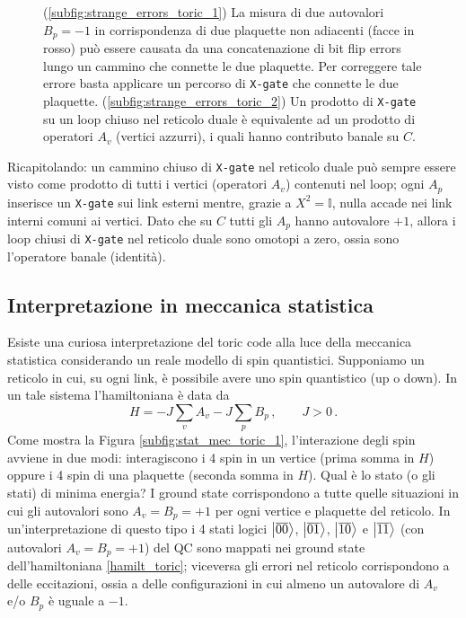 \begin{figure}[!ht]
	\caption{(\ref{subfig:strange_errors_toric_1}) La misura di due autovalori $B_p = -1$ in corrispondenza di due plaquette non adiacenti (facce in rosso) può essere causata da una concatenazione di bit flip errors lungo un cammino che connette le due plaquette. Per correggere tale errore basta applicare un percorso di \texttt{X-gate} che connette le due plaquette. (\ref{subfig:strange_errors_toric_2}) Un prodotto di \texttt{X-gate} su un loop chiuso nel reticolo duale è equivalente ad un prodotto di operatori $A_v$ (vertici azzurri), i quali hanno contributo banale su $C$.}
    \label{fig:strange_errors_toric}
\end{figure}

\noindent Ricapitolando: un cammino chiuso di \texttt{X-gate} nel reticolo duale può sempre essere visto come prodotto di tutti i vertici (operatori $A_v$) contenuti nel loop; ogni $A_p$ inserisce un \texttt{X-gate} sui link esterni mentre, grazie a $X^2 = \mathbb{I}$, nulla accade nei link interni comuni ai vertici. Dato che su $C$ tutti gli $A_p$ hanno autovalore $+1$, allora i loop chiusi di \texttt{X-gate} nel reticolo duale sono omotopi a zero, ossia sono l'operatore banale (identità). 

\subsection{Interpretazione in meccanica statistica}
Esiste una curiosa interpretazione del toric code alla luce della meccanica statistica considerando un reale modello di spin quantistici. Supponiamo un reticolo in cui, su ogni link, è possibile avere uno spin quantistico (up o down). In un tale sistema l'hamiltoniana è data da 
\begin{equation}\label{hamilt_toric}
    H = - J \sum_v A_v - J \sum_p B_p \, , \qquad J > 0 \, .
\end{equation}
Come mostra la Figura \ref{subfig:stat_mec_toric_1}, l'interazione degli spin avviene in due modi: interagiscono i 4 spin in un vertice (prima somma in $H$) oppure i 4 spin di una plaquette (seconda somma in $H$). Qual è lo stato (o gli stati) di minima energia? I ground state corrispondono a tutte quelle situazioni in cui gli autovalori sono $A_v = B_p = +1$ per ogni vertice e plaquette del reticolo. In un'interpretazione di questo tipo i 4 stati logici $\ket{\overline{00}}$, $\ket{\overline{01}}$, $\ket{\overline{10}}$ e $\ket{\overline{11}}$ (con autovalori $A_v = B_p = +1$) del QC sono mappati nei ground state dell'hamiltoniana \eqref{hamilt_toric}; viceversa gli errori nel reticolo corrispondono a delle eccitazioni, ossia a delle configurazioni in cui almeno un autovalore di $A_v$ e/o $B_p$ è uguale a $-1$. 

